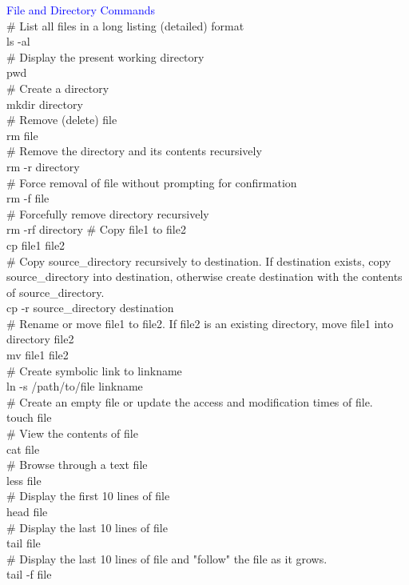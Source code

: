 \documentclass{article}
\begin{document}
\textcolor{blue}{File and Directory Commands }\\
\noindent
\# List all files in a long listing (detailed) format\\
ls -al\\
\# Display the present working directory\\
pwd\\
\# Create a directory\\
mkdir directory\\
\# Remove (delete) file\\
rm file\\
\# Remove the directory and its contents recursively\\
rm -r directory\\
\# Force removal of file without prompting for confirmation\\
rm -f file\\
\# Forcefully remove directory recursively\\
rm -rf directory
\# Copy file1 to file2\\
cp file1 file2\\
\# Copy source\_directory recursively to destination. If destination exists, copy source\_directory into destination, otherwise create destination with the contents of source\_directory.\\
cp -r source\_directory destination\\
\# Rename or move file1 to file2. If file2 is an existing directory, move file1 into directory file2\\
mv file1 file2\\
\# Create symbolic link to linkname\\
ln -s /path/to/file linkname\\
\# Create an empty file or update the access and modification times of file.\\
touch file\\
\# View the contents of file\\
cat file\\
\# Browse through a text file\\
less file\\
\# Display the first 10 lines of file\\
head file\\
\# Display the last 10 lines of file\\
tail file\\
\# Display the last 10 lines of file and "follow" the file as it grows.\\
tail -f file\\
\end{document}
